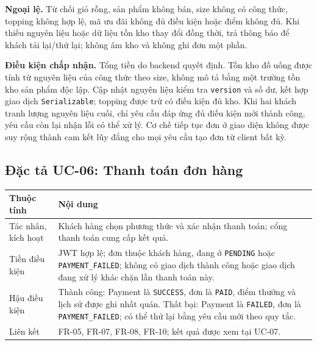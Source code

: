 \textbf{Ngoại lệ.} Từ chối giỏ rỗng, sản phẩm không bán, size không có
công thức, topping không hợp lệ, mã ưu đãi không đủ điều kiện hoặc điểm
không đủ. Khi thiếu nguyên liệu hoặc dữ liệu tồn kho thay đổi đồng thời,
trả thông báo để khách tải lại/thử lại; không âm kho và không ghi đơn một phần.

\textbf{Điều kiện chấp nhận.} Tổng tiền do backend quyết định. Tồn kho
đồ uống được tính từ nguyên liệu của công thức theo size, không mô tả
bằng một trường tồn kho sản phẩm độc lập. Cập nhật nguyên liệu kiểm tra
\texttt{version} và số dư, kết hợp giao dịch \texttt{Serializable}; topping
được trừ có điều kiện đủ kho. Khi hai khách tranh lượng nguyên liệu cuối,
chỉ yêu cầu đáp ứng đủ điều kiện mới thành công, yêu cầu còn lại nhận lỗi
có thể xử lý. Cơ chế tiếp tục đơn ở giao diện không được suy rộng thành
cam kết lũy đẳng cho mọi yêu cầu tạo đơn từ client bất kỳ.

\subsection{Đặc tả UC-06: Thanh toán đơn hàng}
\label{uc:06}
\label{uc06}

\begin{longtable}{|p{3.1cm}|p{11.5cm}|}
\hline \textbf{Thuộc tính} & \textbf{Nội dung} \\ \hline
Tác nhân, kích hoạt & Khách hàng chọn phương thức và xác nhận thanh toán;
cổng thanh toán cung cấp kết quả. \\ \hline
Tiền điều kiện & JWT hợp lệ; đơn thuộc khách hàng, đang ở
\texttt{PENDING} hoặc \texttt{PAYMENT\_FAILED}; không có giao dịch thành
công hoặc giao dịch đang xử lý khác chặn lần thanh toán này. \\ \hline
Hậu điều kiện & Thành công: Payment là \texttt{SUCCESS}, đơn là
\texttt{PAID}, điểm thưởng và lịch sử được ghi nhất quán. Thất bại:
Payment là \texttt{FAILED}, đơn là \texttt{PAYMENT\_FAILED}; có thể thử
lại bằng yêu cầu mới theo quy tắc. \\ \hline
Liên kết & FR-05, FR-07, FR-08, FR-10; kết quả được xem tại UC-07. \\ \hline
\end{longtable}

